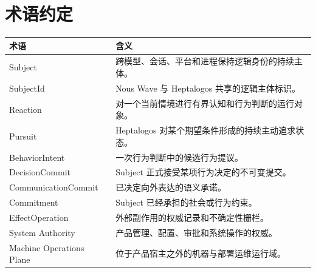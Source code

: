 \chapter*{术语约定}

\begin{longtable}{>{\raggedright\arraybackslash}p{4.5cm}>{\raggedright\arraybackslash}p{9.1cm}}
\toprule
\textbf{术语} & \textbf{含义}\\
\midrule
Subject & 跨模型、会话、平台和进程保持逻辑身份的持续主体。\\
SubjectId & Nous Wave 与 Heptalogos 共享的逻辑主体标识。\\
Reaction & 对一个当前情境进行有界认知和行为判断的运行对象。\\
Pursuit & Heptalogos 对某个期望条件形成的持续主动追求状态。\\
BehaviorIntent & 一次行为判断中的候选行为提议。\\
DecisionCommit & Subject 正式接受某项行为决定的不可变提交。\\
CommunicationCommit & 已决定向外表达的语义承诺。\\
Commitment & Subject 已经承担的社会或行为约束。\\
EffectOperation & 外部副作用的权威记录和不确定性栅栏。\\
System Authority & 产品管理、配置、审批和系统操作的权威。\\
Machine Operations Plane & 位于产品宿主之外的机器与部署运维运行域。\\
\bottomrule
\end{longtable}
\clearpage
